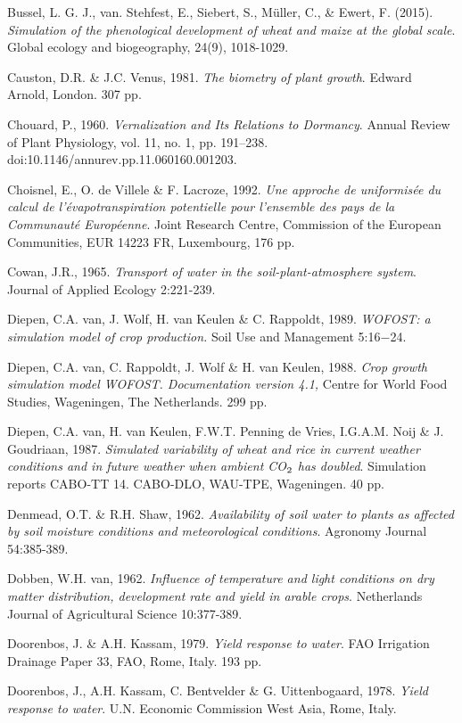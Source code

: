 Bussel, L. G. J., van. Stehfest, E., Siebert, S., Müller, C., \& Ewert, F. (2015). {\it Simulation of 
the phenological development of wheat and maize at the global scale}. Global ecology and biogeography, 
24(9), 1018-1029.

Causton, D.R. \& J.C. Venus, 1981. {\it The biometry of plant growth\/}. Edward Arnold, London.
307 pp.

Chouard, P., 1960. \textit{Vernalization and Its Relations to Dormancy}. Annual Review of Plant Physiology, vol. 11, no. 1, 
pp. 191–238. doi:10.1146/annurev.pp.11.060160.001203.

Choisnel, E., O. de Villele \& F. Lacroze, 1992. {\it Une approche de uniformis\'{e}e du calcul de
l'\'{e}vapotranspiration potentielle pour l'ensemble des pays de la Communaut\'{e} Europ\'{e}enne\/}.
Joint Research Centre, Commission of the European Communities, EUR 14223 FR,
Luxembourg, 176 pp.

Cowan, J.R., 1965. {\it Transport of water in the soil-plant-atmosphere system\/}. Journal of
Applied Ecology 2:221-239.

Diepen, C.A. van, J. Wolf, H. van Keulen \& C. Rappoldt, 1989. {\it WOFOST: a simulation
model of crop production.\/} Soil Use and Management 5:16$-$24. 

Diepen, C.A. van, C. Rappoldt, J. Wolf \& H. van Keulen, 1988. {\it Crop growth simulation
model WOFOST. Documentation version 4.1,\/} Centre for World Food Studies, Wageningen,
The Netherlands. 299 pp. 

Diepen, C.A. van, H. van Keulen, F.W.T. Penning de Vries, I.G.A.M. Noij \& J.
Goudriaan, 1987. {\it Simulated variabil\-ity of wheat and rice in current weather conditions and
in future weather when ambient CO$_{{\rm 2}}$ has doubled\/}. Simulation reports CABO-TT 14. CABO-DLO, WAU-TPE, Wageningen. 40 pp.

Denmead, O.T. \& R.H. Shaw, 1962. {\it Availability of soil water to plants as affected by soil
moisture conditions and meteorological conditions\/}. Agronomy Journal 54:385-389.

Dobben, W.H. van, 1962. {\it Influence of temperature and light conditions on dry matter
distribution, development rate and yield in arable crops\/}. Netherlands Journal of Agricultural
Science 10:377-389.

Doorenbos, J. \& A.H. Kassam, 1979. {\it Yield response to water\/}. FAO Irrigation Drainage
Paper 33, FAO, Rome, Italy. 193 pp.

Doorenbos, J., A.H. Kassam, C. Bentvelder \& G. Uittenbogaard, 1978. {\it Yield response to
water\/}. U.N. Economic Commission West Asia, Rome, Italy.

